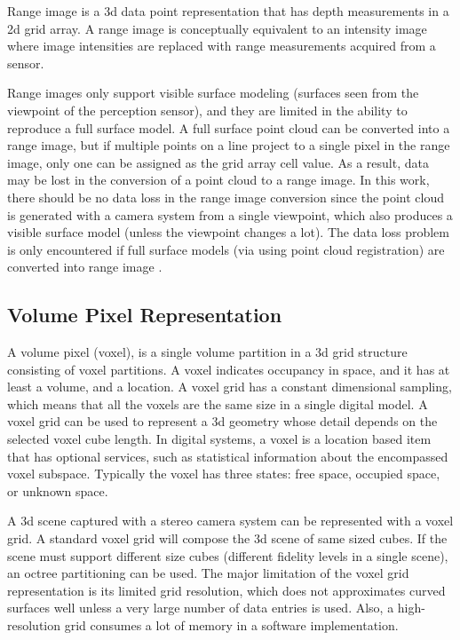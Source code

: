 \documentclass[12pt,a4paper,oneside,pdftex]{report}
\begin{document}
Range image is a 3d data point representation that has depth measurements in a 2d grid array. A range image is conceptually equivalent to an intensity image where image intensities are replaced with range measurements acquired from a sensor.

Range images only support visible surface modeling (surfaces seen from the viewpoint of the perception sensor), and they are limited in the ability to reproduce a full surface model. A full surface point cloud can be converted into a range image, but if multiple points on a line project to a single pixel in the range image, only one can be assigned as the grid array cell value. As a result, data may be lost in the conversion of a point cloud to a range image. In this work, there should be no data loss in the range image conversion since the point cloud is generated with a camera system from a single viewpoint, which also produces a visible surface model (unless the viewpoint changes a lot). The data loss problem is only encountered if full surface models (via using point cloud registration) are converted into range image \citep{Unnikrishnan08}.

\subsection{Volume Pixel Representation}
\label{subsection:volume_pixel_representation}

A volume pixel (voxel), is a single volume partition in a 3d grid structure consisting of voxel partitions. A voxel indicates occupancy in space, and it has at least a volume, and a location. A voxel grid has a constant dimensional sampling, which means that all the voxels are the same size in a single digital model. A voxel grid can be used to represent a 3d geometry whose detail depends on the selected voxel cube length. In digital systems, a voxel is a location based item that has optional services, such as statistical information about the encompassed voxel subspace. Typically the voxel has three states: free space, occupied space, or unknown space.

A 3d scene captured with a stereo camera system can be represented with a voxel grid. A standard voxel grid will compose the 3d scene of same sized cubes. If the scene must support different size cubes (different fidelity levels in a single scene), an octree partitioning can be used. The major limitation of the voxel grid representation is its limited grid resolution, which does not approximates curved surfaces well unless a very large number of data entries is used. Also, a high-resolution grid consumes a lot of memory in a software implementation.
\end{document}
